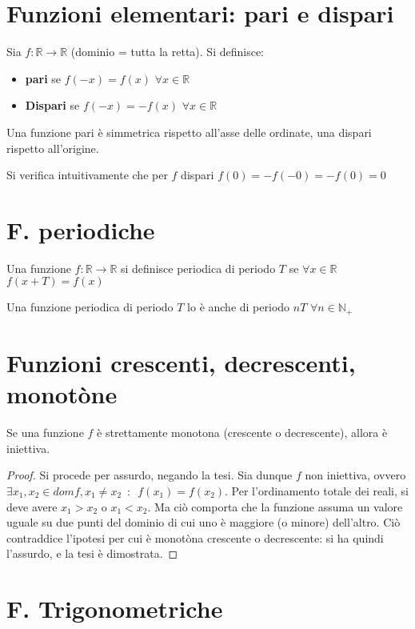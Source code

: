 \documentclass[10pt, oneside]{book}
\theoremstyle{plain}
\begin{document}
\section{Funzioni elementari: pari e dispari}
\begin{defin}
    Sia $f : \mathbb{R} \rightarrow \mathbb{R}$ (dominio = tutta la retta). Si definisce:
    \begin{itemize}[label = $\square$]
        \item \textbf{pari} se $f(-x) = f(x)$ $\forall x \in \mathbb{R}$
        \item \textbf{Dispari} se $f(-x) = - f(x)$ $\forall x \in \mathbb{R}$
    \end{itemize}
    Una funzione pari è simmetrica rispetto all'asse delle ordinate, una dispari rispetto all'origine.
\end{defin}
Si verifica intuitivamente che per $f$ dispari $f(0) = - f(-0) = - f(0) = 0$

\section{F. periodiche}
\begin{defin}
    Una funzione $f : \mathbb{R} \rightarrow \mathbb{R}$ si definisce periodica di periodo $T$ se $\forall x \in \mathbb{R}$ $f(x+T) = f(x)$
    \end{defin}
    Una funzione periodica di periodo $T$ lo è anche di periodo $nT$ $\forall n \in \mathbb{N}_+$

\section{Funzioni crescenti, decrescenti, monotòne}
\begin{prop}
Se una funzione $f$ è strettamente monotona (crescente o decrescente), allora è iniettiva.
\end{prop}
\begin{proof}
Si procede per assurdo, negando la tesi. Sia dunque $f$ non iniettiva, ovvero $\exists x_1, x_2 \in domf, x_1 \neq x_2 \enspace : \enspace f(x_1) = f(x_2)$. Per l'ordinamento totale dei reali, si deve avere $x_1 > x_2$ o $x_1 < x_2$. Ma ciò comporta che la funzione assuma un valore uguale su due punti del dominio di cui uno è maggiore (o minore) dell'altro. Ciò contraddice l'ipotesi per cui è monotòna crescente o decrescente: si ha quindi l'assurdo, e la tesi è dimostrata.
\end{proof}

\section{F. Trigonometriche}
\end{document}
